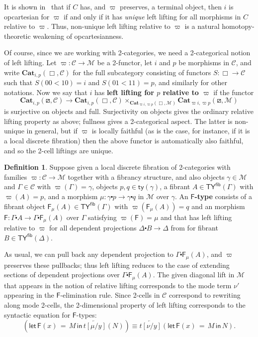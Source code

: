 \documentclass[10pt]{article}
\theoremstyle{definition}
\newtheorem{definition}{Definition}
\newcommand{\rewrite}[2]{\overleftarrow{#1}(#2)}
\newcommand\Fsym{\ensuremath{\mathsf{F}}}
\newcommand\F[2]{\ensuremath{\mathsf{F}_{#1}(#2)}}
\newcommand\FE[3]{\ensuremath{\mathsf{let} \, \mathsf{F}(#2) \, = \, {#1} \, \mathsf{in} \, #3}}
\newcommand\Cat{\mathbf{Cat}}
\newcommand\M{\mathcal{M}}
\newcommand\Mty{\mathsf{ty}}
\newcommand\C{\mathcal{C}}
\newcommand\Cfibty{\mathsf{TY}^{\mathsf{fib}}}
\newcommand\vp{\varpi}
\newcommand\ce{\mathord{\centerdot}}
\begin{document}
It is shown in~\cite{CagneMellies2019} that if $C$ has, and $\vp$ preserves, a terminal object, then $i$ is opcartesian for $\vp$ if and only if it has \emph{unique} left lifting for all morphisms in $C$ relative to $\vp$.
Thus, non-unique left lifting relative to $\vp$ is a natural homotopy-theoretic weakening of opcartesianness.

Of course, since we are working with 2-categories, we need a 2-categorical notion of left lifting.
Let $\vp:\C\to\M$ be a 2-functor, let $i$ and $p$ be morphisms in $\C$, and write $\Cat_{i,p}(\Box,\C)$ for the full subcategory consisting of functors $S:\Box\to \C$ such that $S(00<10)=i$ and $S(01<11)=p$, and similarly for other notations.
Now we say that $i$ has \textbf{left lifting for $p$ relative to $\vp$} if the functor
\[ \Cat_{i,p}(\boxslash,\C) \to \Cat_{i,p}(\Box,\C) \times_{\Cat_{\vp i,\vp p}(\Box,\M)} \Cat_{\vp i,\vp p}(\boxslash,\M) \]
is surjective on objects and full.
Surjectivity on objects gives the ordinary relative lifting property as above; fullness gives a 2-categorical aspect.
The latter is non-unique in general, but if $\vp$ is locally faithful (as is the case, for instance, if it is a local discrete fibration) then the above functor is automatically also faithful, and so the 2-cell liftings are unique.

\begin{definition}\label{defn:E-sem}
  Suppose given a local discrete fibration of 2-categories with families $\vp:\C\to\M$ together with a fibrancy structure, and also objects $\gamma\in\M$ and $\Gamma\in \C$ with $\vp(\Gamma)=\gamma$, objects $p,q\in \Mty(\gamma)$, a fibrant $A\in\Cfibty(\Gamma)$ with $\vp(A)=p$, and a morphism $\mu : \gamma \ce p \to \gamma\ce q$ in $\M$ over $\gamma$.
  An \textbf{$\Fsym$-type} consists of a fibrant object $\F{\mu}{A} \in \Cfibty(\Gamma)$ with $\vp(\F{\mu}{A}) = q$ and an morphism $\Fsym:\Gamma\ce A \to \Gamma\ce \F\mu A$ over $\Gamma$ satisfying $\vp(\Fsym)=\mu$ and that has left lifting relative to $\vp$ for all dependent projections $\Delta\ce B \to \Delta$ from for fibrant $B\in \Cfibty(\Delta)$.
\end{definition}

As usual, we can pull back any dependent projection to $\Gamma\ce \F\mu A$, and $\vp$ preserves these pullbacks; thus left lifting reduces to the case of extending sections of dependent projections over $\Gamma\ce \F\mu A$.
The given diagonal lift in $\M$ that appears in the notion of relative lifting corresponds to the mode term $\nu'$ appearing in the $\Fsym$-elimination rule.
Since 2-cells in $\C$ correspond to rewriting along mode 2-cells, the 2-dimensional property of left lifting corresponds to the syntactic equation for $\Fsym$-types:
\[ (\FE{M}{x}{\rewrite{t[\mu/y]}{N}}) \equiv \rewrite{t[\nu/y]}{\FE{M}{x}{N}}.\]
\end{document}
